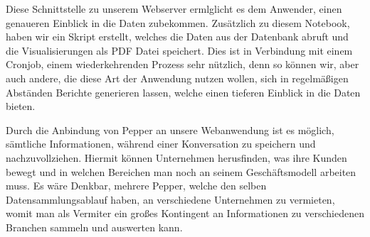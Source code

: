Diese Schnittstelle zu unserem Webserver ermlglicht es dem Anwender, einen genaueren Einblick in die Daten zubekommen.
Zusätzlich zu diesem Notebook, haben wir ein Skript erstellt, welches die Daten aus der Datenbank abruft und die Visualisierungen
als PDF Datei speichert. Dies ist in Verbindung mit einem Cronjob, einem wiederkehrenden Prozess sehr nützlich, denn
so können wir, aber auch andere, die diese Art der Anwendung nutzen wollen, sich in regelmäßigen Abständen
Berichte generieren lassen, welche einen tieferen Einblick in die Daten bieten.

Durch die Anbindung von Pepper an unsere Webanwendung ist es möglich, sämtliche Informationen,
während einer Konversation zu speichern und nachzuvollziehen. Hiermit können Unternehmen
herusfinden, was ihre Kunden bewegt und in welchen Bereichen man noch an seinem
Geschäftsmodell arbeiten muss. Es wäre Denkbar, mehrere Pepper, welche den selben Datensammlungsablauf haben,
an verschiedene Unternehmen zu vermieten, womit man als Vermiter ein großes Kontingent an
Informationen zu verschiedenen Branchen sammeln und auswerten kann.

